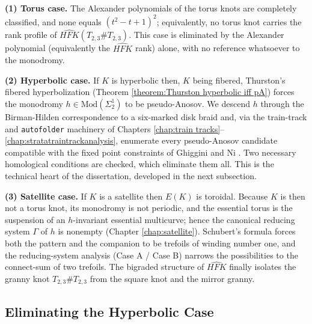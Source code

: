 \textbf{(1) Torus case.} The Alexander polynomials of the torus knots are completely classified, and none equals $(t^2 - t + 1)^2$; equivalently, no torus knot carries the rank profile of $\widehat{HFK}(T_{2,3}\# T_{2,3})$. This case is eliminated by the Alexander polynomial (equivalently the $\widehat{HFK}$ rank) alone, with no reference whatsoever to the monodromy.

\textbf{(2) Hyperbolic case.} If $K$ is hyperbolic then, $K$ being fibered, Thurston's fibered hyperbolization (Theorem \ref{theorem:Thurston hyperbolic iff pA}) forces the monodromy $h \in \mathrm{Mod}(\Sigma_2^1)$ to be pseudo-Anosov. We descend $h$ through the Birman-Hilden correspondence to a six-marked disk braid and, via the train-track and \texttt{autofolder} machinery of Chapters \ref{chap:train tracks}--\ref{chap:stratatraintrackanalysis}, enumerate every pseudo-Anosov candidate compatible with the fixed point constraints of Ghiggini \cite{ghiggini2022heegaard} and Ni \cite{Ni07}. Two necessary homological conditions are checked, which eliminate them all. This is the technical heart of the dissertation, developed in the next subsection.

\textbf{(3) Satellite case.} If $K$ is a satellite then $E(K)$ is toroidal. Because $K$ is then not a torus knot, its monodromy is not periodic, and the essential torus is the suspension of an $h$-invariant essential multicurve; hence the canonical reducing system $\Gamma$ of $h$ is nonempty (Chapter \ref{chap:satellite}). Schubert's formula \cite{schubert1953knoten} forces both the pattern and the companion to be trefoils of winding number one, and the reducing-system analysis (Case A / Case B) narrows the possibilities to the connect-sum of two trefoils. The bigraded structure of $\widehat{HFK}$ finally isolates the granny knot $T_{2,3}\# T_{2,3}$ from the square knot and the mirror granny.

\subsection{Eliminating the Hyperbolic Case}

